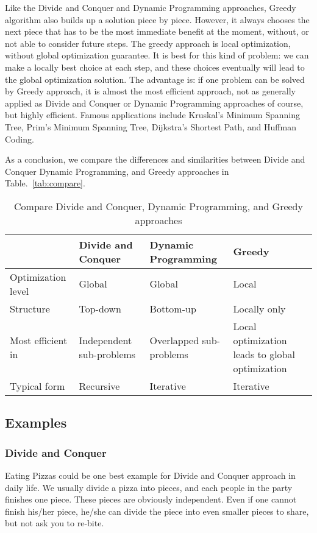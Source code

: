 \documentclass[natbib,12pt]{article}
\begin{document}
	Like the Divide and Conquer and Dynamic Programming approaches, Greedy algorithm also builds up a solution piece by piece. However, it always chooses the next piece that has to be the most immediate benefit at the moment, without, or not able to consider future steps. The greedy approach is local optimization, without global optimization guarantee. It is best for this kind of problem: we can make a locally best choice at each step, and these choices eventually will lead to the global optimization solution. The advantage is: if one problem can be solved by Greedy approach, it is almost the most efficient approach, not as generally applied as Divide and Conquer or Dynamic Programming approaches of course, but highly efficient. Famous applications include Kruskal’s Minimum Spanning Tree, Prim’s Minimum Spanning Tree, Dijkstra’s Shortest Path, and Huffman Coding.
	
	As a conclusion, we compare the differences and similarities between Divide and Conquer Dynamic Programming, and Greedy approaches in Table.~\vref{tab:compare}.
	
	\begin{table}[htpb]
		\centering
		\begin{tabular}{p{1.2in}|p{1.2in}|p{1.2in}|p{1.2in}}
			& Divide and Conquer &    Dynamic Programming & Greedy \\\hline
			Optimization level & Global & Global & Local \\
			Structure & Top-down & Bottom-up & Locally only \\
			Most efficient in & Independent sub-problems & Overlapped sub-problems & Local optimization leads to global optimization \\
			Typical form & Recursive & Iterative & Iterative
		\end{tabular}
		\caption{\label{tab:compare}Compare Divide and Conquer, Dynamic Programming, and Greedy approaches}
	\end{table}
	
	\subsection*{Examples}
	
	\subsubsection*{Divide and Conquer}
	Eating Pizzas could be one best example for Divide and Conquer approach in daily life. We usually divide a pizza into pieces, and each people in the party finishes one piece. These pieces are obviously independent. Even if one cannot finish his/her piece, he/she can divide the piece into even smaller pieces to share, but not ask you to re-bite.
	
\end{document}
